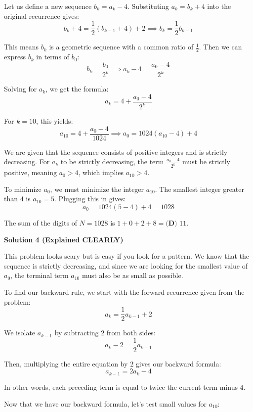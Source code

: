 \begin{enumerate}
 Let us define a new sequence $b_k = a_k - 4$. Substituting $a_k = b_k + 4$ into the original recurrence gives:
 \[b_k + 4 = \frac{1}{2}(b_{k-1} + 4) + 2 \implies b_k = \frac{1}{2}b_{k-1}\]

 This means $b_k$ is a geometric sequence with a common ratio of $\frac{1}{2}$. Then we can express $b_k$ in terms of $b_0$:
 \[b_k = \frac{b_0}{2^k} \implies a_k - 4 = \frac{a_0 - 4}{2^k}\]

 Solving for $a_k$, we get the formula:
 \[a_k = 4 + \frac{a_0 - 4}{2^k}\]

 For $k = 10$, this yields:
 \[a_{10} = 4 + \frac{a_0 - 4}{1024} \implies a_0 = 1024(a_{10} - 4) + 4\]

 We are given that the sequence consists of positive integers and is strictly decreasing. For $a_k$ to be strictly decreasing, the term $\frac{a_0 - 4}{2^k}$ must be strictly positive, meaning $a_0 > 4$, which implies $a_{10} > 4$.

 To minimize $a_0$, we must minimize the integer $a_{10}$. The smallest integer greater than $4$ is $a_{10} = 5$. Plugging this in gives:
 \[a_0 = 1024(5 - 4) + 4 = 1028\]

 The sum of the digits of $N = 1028$ is $1 + 0 + 2 + 8 = \boxed{\textbf{(D) } 11}$.

 



\textbf{Solution 4 (Explained CLEARLY)}

This problem looks scary but is easy if you look for a pattern. We know that the sequence is strictly decreasing, and since we are looking for the smallest value of $a_0$, the terminal term $a_{10}$ must also be as small as possible. 

 To find our backward rule, we start with the forward recurrence given from the problem:
 \[a_k = \frac{1}{2}a_{k-1} + 2\]

 We isolate $a_{k-1}$ by subtracting $2$ from both sides:
 \[a_k - 2 = \frac{1}{2}a_{k-1}\]

 Then, multiplying the entire equation by $2$ gives our backward formula:
 \[a_{k-1} = 2a_k - 4\]

 In other words, each preceding term is equal to twice the current term minus $4$.

 Now that we have our backward formula, let's test small values for $a_{10}$:


\end{enumerate}
